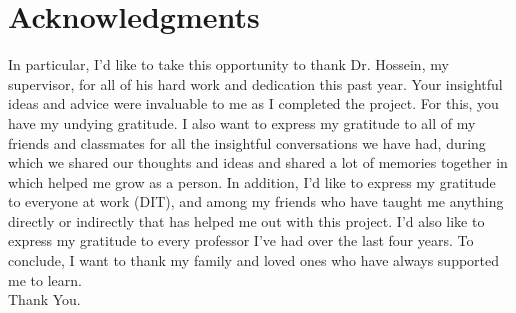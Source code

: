 \chapter*{Acknowledgments}

\begin{justify}
    In particular, I'd like to take this opportunity to thank Dr. Hossein, my supervisor, for all of his hard work and dedication this past year. Your insightful ideas and advice were invaluable to me as I completed the project. For this, you have my undying gratitude.
    \vspace{0.25cm}
    \newendline I also want to express my gratitude to all of my friends and classmates for all the insightful conversations we have had, during which we shared our thoughts and ideas and shared a lot of memories together in which helped me grow as a person.
    \vspace{0.25cm}
    \newendline In addition, I'd like to express my gratitude to everyone at work (DIT), and among my friends who have taught me anything directly or indirectly that has helped me out with this project.
    \vspace{0.25cm}
    \newendline I'd also like to express my gratitude to every professor I've had over the last four years.
    \vspace{0.25cm}
    \newendline To conclude, I want to thank my family and loved ones who have always supported me to learn.\\
    
    \newendline Thank You.
\end{justify}

\clearpage